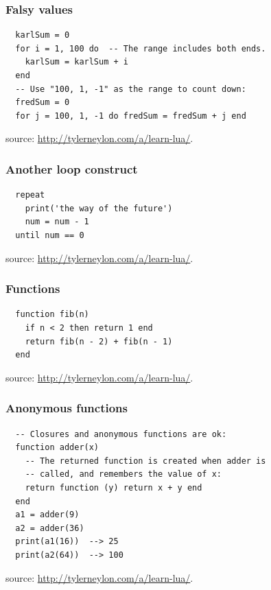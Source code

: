 \begin{frame}[fragile]
  \frametitle{Falsy values}
  \begin{verbatim}
  karlSum = 0
  for i = 1, 100 do  -- The range includes both ends.
    karlSum = karlSum + i
  end
  -- Use "100, 1, -1" as the range to count down:
  fredSum = 0
  for j = 100, 1, -1 do fredSum = fredSum + j end
  \end{verbatim}
  \begin{center}
    \begin{tiny}
      source: \url{http://tylerneylon.com/a/learn-lua/}.
    \end{tiny}
  \end{center}
\end{frame}


\begin{frame}[fragile]
  \frametitle{Another loop construct}
  \begin{verbatim}
  repeat
    print('the way of the future')
    num = num - 1
  until num == 0
  \end{verbatim}
  \vfill
  \begin{center}
    \begin{tiny}
      source: \url{http://tylerneylon.com/a/learn-lua/}.
    \end{tiny}
  \end{center}
\end{frame}


\begin{frame}[fragile]
  \frametitle{Functions}
  \begin{verbatim}
  function fib(n)
    if n < 2 then return 1 end
    return fib(n - 2) + fib(n - 1)
  end
  \end{verbatim}
  \vfill
  \begin{center}
    \begin{tiny}
      source: \url{http://tylerneylon.com/a/learn-lua/}.
    \end{tiny}
  \end{center}
\end{frame}


\begin{frame}[fragile]
  \frametitle{Anonymous functions}
  \begin{verbatim}
  -- Closures and anonymous functions are ok:
  function adder(x)
    -- The returned function is created when adder is
    -- called, and remembers the value of x:
    return function (y) return x + y end
  end
  a1 = adder(9)
  a2 = adder(36)
  print(a1(16))  --> 25
  print(a2(64))  --> 100
  \end{verbatim}
  \vfill
  \begin{center}
    \begin{tiny}
      source: \url{http://tylerneylon.com/a/learn-lua/}.
    \end{tiny}
  \end{center}
\end{frame}


